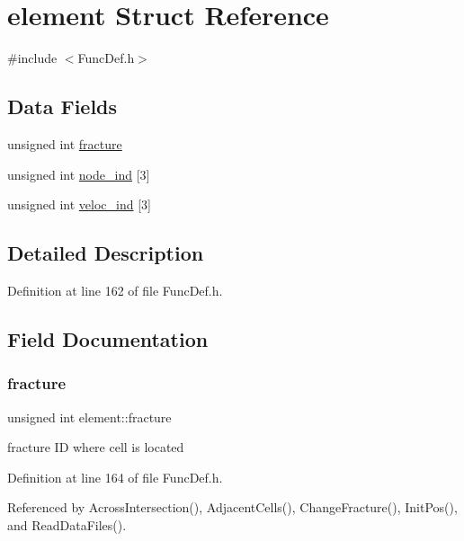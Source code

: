 \hypertarget{structelement}{}\section{element Struct Reference}
\label{structelement}


{\ttfamily \#include $<$Func\+Def.\+h$>$}

\subsection*{Data Fields}
\begin{DoxyCompactItemize}
\item 
unsigned int \mbox{\hyperlink{structelement_af51b08146a1c495aadf45e7f085e1267}{fracture}}
\item 
unsigned int \mbox{\hyperlink{structelement_aadc95dc4817009223151c40387f40e06}{node\+\_\+ind}} \mbox{[}3\mbox{]}
\item 
unsigned int \mbox{\hyperlink{structelement_ab6062a713eca6e7458529ea45dea64d3}{veloc\+\_\+ind}} \mbox{[}3\mbox{]}
\end{DoxyCompactItemize}


\subsection{Detailed Description}


Definition at line 162 of file Func\+Def.\+h.



\subsection{Field Documentation}
\mbox{\label{structelement_af51b08146a1c495aadf45e7f085e1267}} 
\subsubsection{\texorpdfstring{fracture}{fracture}}
{\footnotesize\ttfamily unsigned int element\+::fracture}

fracture ID where cell is located 

Definition at line 164 of file Func\+Def.\+h.



Referenced by Across\+Intersection(), Adjacent\+Cells(), Change\+Fracture(), Init\+Pos(), and Read\+Data\+Files().

